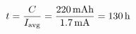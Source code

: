 \documentclass[preview]{standalone}
\begin{document}
\begin{align*}
\special{dvisvgm:raw <g id='unique000'>}t = \frac{C}{I_{\text{avg}}} = \frac{220\,\text{mAh}}{1.7\,\text{mA}} = 130\,\text{h}\special{dvisvgm:raw </g>}
\end{align*}
\end{document}
